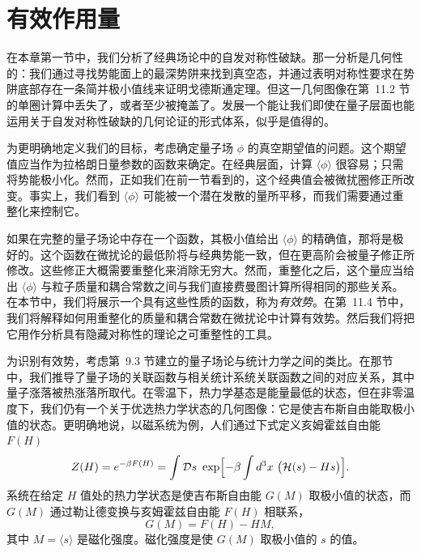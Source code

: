\section{有效作用量}

在本章第一节中，我们分析了经典场论中的自发对称性破缺。那一分析是几何性的：我们通过寻找势能面上的最深势阱来找到真空态，并通过表明对称性要求在势阱底部存在一条简并极小值线来证明戈德斯通定理。但这一几何图像在第~11.2 节的单圈计算中丢失了，或者至少被掩盖了。发展一个能让我们即使在量子层面也能运用关于自发对称性破缺的几何论证的形式体系，似乎是值得的。

为更明确地定义我们的目标，考虑确定量子场 $\phi$ 的真空期望值的问题。这个期望值应当作为拉格朗日量参数的函数来确定。在经典层面，计算 $\langle\phi\rangle$ 很容易；只需将势能极小化。然而，正如我们在前一节看到的，这个经典值会被微扰圈修正所改变。事实上，我们看到 $\langle\phi\rangle$ 可能被一个潜在发散的量所平移，而我们需要通过重整化来控制它。

如果在完整的量子场论中存在一个函数，其极小值给出 $\langle\phi\rangle$ 的精确值，那将是极好的。这个函数在微扰论的最低阶将与经典势能一致，但在更高阶会被量子修正所修改。这些修正大概需要重整化来消除无穷大。然而，重整化之后，这个量应当给出 $\langle\phi\rangle$ 与粒子质量和耦合常数之间与我们直接费曼图计算所得相同的那些关系。在本节中，我们将展示一个具有这些性质的函数，称为\emph{有效势}。在第~11.4 节中，我们将解释如何用重整化的质量和耦合常数在微扰论中计算有效势。然后我们将把它用作分析具有隐藏对称性的理论之可重整性的工具。

为识别有效势，考虑第~9.3 节建立的量子场论与统计力学之间的类比。在那节中，我们推导了量子场的关联函数与相关统计系统关联函数之间的对应关系，其中量子涨落被热涨落所取代。在零温下，热力学基态是能量最低的状态，但在非零温度下，我们仍有一个关于优选热力学状态的几何图像：它是使吉布斯自由能取极小值的状态。更明确地说，以磁系统为例，人们通过下式定义亥姆霍兹自由能 $F(H)$
\begin{equation}
  Z(H) = e^{-\beta F(H)} = \int \mathcal{D}s\ \exp\Bigl[ -\beta
    \int d^3x\ \bigl( \mathcal{H}(s) - H s \bigr) \Bigr] .
  \label{eq:11.40}
\end{equation}
系统在给定 $H$ 值处的热力学状态是使吉布斯自由能 $G(M)$ 取极小值的状态，而 $G(M)$ 通过勒让德变换与亥姆霍兹自由能 $F(H)$ 相联系，
\begin{equation}
  G(M) = F(H) - HM ,
\end{equation}
其中 $M = \langle s\rangle$ 是磁化强度。磁化强度是使 $G(M)$ 取极小值的 $s$ 的值。


